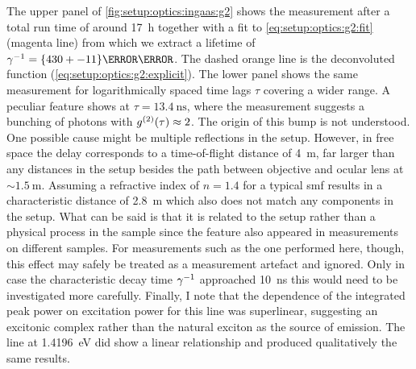 The upper panel of \cref{fig:setup:optics:ingaas:g2} shows the measurement after a total run time of around \qty{17}{\hour} together with a fit to \cref{eq:setup:optics:g2:fit} (magenta line) from which we extract a lifetime of $\gamma\inverse = \qty{430+-11}{\pico\second}$.
The dashed orange line is the deconvoluted function (\cref{eq:setup:optics:g2:explicit}).
The lower panel shows the same measurement for logarithmically spaced time lags $\tau$ covering a wider range.
A peculiar feature shows at $\tau = \qty{13.4}{\nano\second}$, where the measurement suggests a bunching of photons with $g^{(2)}(\tau) \approx 2$.
The origin of this bump is not understood.
One possible cause might be multiple reflections in the setup.
However, in free space the delay corresponds to a time-of-flight distance of \qty{4}{\meter}, far larger than any distances in the setup besides the path between objective and ocular lens at $\sim\qty{1.5}{\meter}$.
Assuming a refractive index of $n=\num{1.4}$ for a typical \gls{smf} results in a characteristic distance of \qty{2.8}{\meter} which also does not match any components in the setup.
What can be said is that it is related to the setup rather than a physical process in the sample since the feature also appeared in  measurements on different samples.
For measurements such as the one performed here, though, this effect may safely be treated as a measurement artefact and ignored.
Only in case the characteristic decay time $\gamma^{-1}$ approached \qty{10}{\nano\second} this would need to be investigated more carefully.
Finally, I note that the dependence of the integrated peak power on excitation power for this line was superlinear, suggesting an excitonic complex rather than the natural exciton as the source of emission.
The line at \qty{1.4196}{\eV} did show a linear relationship and produced qualitatively the same  results.
